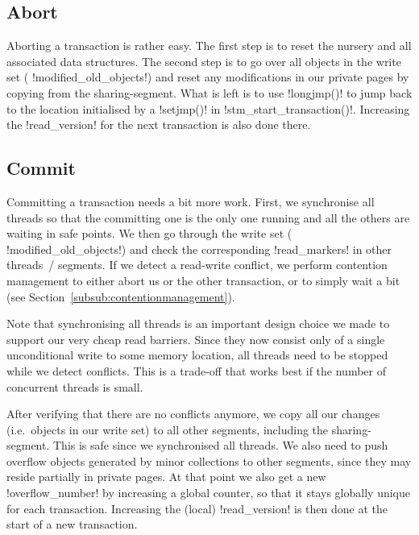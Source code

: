 \documentclass{sigplanconf}
\makeatletter
\renewcommand\lstinline[1][]{%
  \Collectverb{\@@myverb}%
}
\def\@@myverb#1{%
    \begingroup
    \fboxsep=0.2em
    \colorbox{verylightgray}{\oldlstinline|#1|}%
    \endgroup
}
\makeatother
\begin{document}
\subsection{Abort}

Aborting a transaction is rather easy. The first step is to reset the
nursery and all associated data structures. The second step is to go
over all objects in the write set (\lstinline!modified_old_objects!)
and reset any modifications in our private pages by copying from the
sharing-segment. What is left is to use \lstinline!longjmp()!  to jump
back to the location initialised by a \lstinline!setjmp()!  in
\lstinline!stm_start_transaction()!.  Increasing the
\lstinline!read_version! for the next transaction is also done there.




\subsection{Commit}

Committing a transaction needs a bit more work. First, we synchronise
all threads so that the committing one is the only one running and all
the others are waiting in safe points.
We then go through the write
set (\lstinline!modified_old_objects!)  and check the corresponding
\lstinline!read_markers!  in other threads~/ segments. If we detect a
read-write conflict, we perform contention management to either abort us or
the other transaction, or to simply wait a bit (see Section~\ref{subsub:contentionmanagement}).

Note that synchronising all threads is an important design choice we
made to support our very cheap read barriers. Since they now consist
only of a single unconditional write to some memory location, all
threads need to be stopped while we detect conflicts. This is a
trade-off that works best if the number of concurrent threads is
small.

After verifying that there are no conflicts anymore, we copy all our
changes (i.e.\ objects in our write set) to all other segments,
including the sharing-segment. This is safe since we synchronised all
threads. We also need to push overflow objects generated by minor
collections to other segments, since they may reside partially in
private pages. At that point we also get a new
\lstinline!overflow_number! by increasing a global counter, so that it
stays globally unique for each transaction. Increasing the (local)
\lstinline!read_version!  is then done at the start of a new
transaction.
\end{document}
